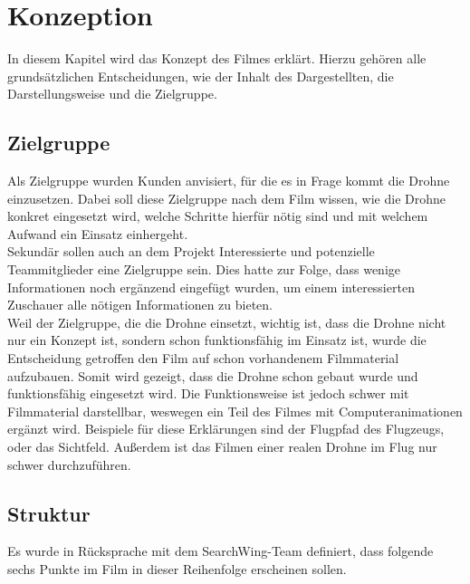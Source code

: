\chapter{Konzeption}
\label{ch:intro}
In diesem Kapitel wird das Konzept des Filmes erklärt. Hierzu gehören alle grundsätzlichen Entscheidungen, wie der Inhalt des Dargestellten, die Darstellungsweise und die Zielgruppe.

\section{Zielgruppe}
\label{sec:konzept:zielgruppe}


Als Zielgruppe wurden Kunden anvisiert, für die es in Frage kommt die Drohne einzusetzen. Dabei soll diese Zielgruppe nach dem Film wissen, wie die Drohne konkret eingesetzt wird, welche Schritte hierfür nötig sind und mit welchem Aufwand ein Einsatz einhergeht.\\
Sekundär sollen auch an dem Projekt Interessierte und potenzielle Teammitglieder eine Zielgruppe sein. Dies hatte zur Folge, dass wenige Informationen noch ergänzend eingefügt wurden, um einem interessierten Zuschauer alle nötigen Informationen zu bieten.\\
Weil der Zielgruppe, die die Drohne einsetzt, wichtig ist, dass die Drohne nicht nur ein Konzept ist, sondern schon funktionsfähig im Einsatz ist, wurde die Entscheidung getroffen den Film auf schon vorhandenem Filmmaterial aufzubauen. Somit wird gezeigt, dass die Drohne schon gebaut wurde und funktionsfähig eingesetzt wird. Die Funktionsweise ist jedoch schwer mit Filmmaterial darstellbar, weswegen ein Teil des Filmes mit Computeranimationen ergänzt wird. Beispiele für diese Erklärungen sind der Flugpfad des Flugzeugs, oder das Sichtfeld. Außerdem ist das Filmen einer realen Drohne im Flug nur schwer durchzuführen.

\section{Struktur} %
\label{sec:konzept:outline}

Es wurde in Rücksprache mit dem SearchWing-Team definiert, dass folgende sechs Punkte im Film in dieser Reihenfolge erscheinen sollen.

